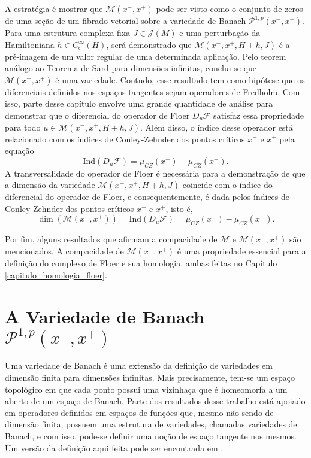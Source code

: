 \documentclass[12pt]{book}
\newcommand{\caminhosexponenciaisconectantes}[2]{\mathcal{P}^{1,p}(#1, #2)}
\newcommand{\caminhosexponenciaisconectantespadrao}{\caminhosexponenciaisconectantes{x^{-}}{x^{+}}}
\newcommand{\diferencialfloerponto}[1]{D_{#1}\operadorFloer}
\newcommand{\energiafinitaM}{\mathcal{M}}
\newcommand{\energiafinitaMconectante}{\energiafinitaM(x^{-}, x^{+})}
\newcommand{\energiafinitaMconectanteHamiltoniana}{\energiafinitaM(x^{-}, x^{+},H+h,J)}
\newcommand{\estruturascomplexasM}{\mathcal{J}(M)}
\newcommand{\iconley}[1]{\iconleyabrev(#1)}
\newcommand{\iconleyabrev}{\mu_{CZ}}
\newcommand{\ind}{\text{Ind}}
\newcommand{\operadorFloer}{\mathcal{F}}
\newcommand{\perturbacaoHamiltoniana}[1]{C^{\infty}_{\epsilon}(#1)}
\begin{document}
	A estratégia é mostrar que $\energiafinitaMconectante$ pode ser visto como o conjunto de zeros de uma seção de um fibrado vetorial sobre a variedade de Banach $\caminhosexponenciaisconectantespadrao$. Para uma estrutura complexa fixa $J \in \estruturascomplexasM$ e uma perturbação da Hamiltoniana $h\in \perturbacaoHamiltoniana{H}$, será demonstrado que $\energiafinitaMconectanteHamiltoniana$ é a pré-imagem de um valor regular de uma determinada aplicação. Pelo teorem análogo ao Teorema de Sard para dimensões infinitas, conclui-se que $\energiafinitaMconectante$ é uma variedade. Contudo, esse resultado tem como hipótese que os diferenciais definidos nos espaços tangentes sejam operadores de Fredholm. Com isso, parte desse capítulo envolve uma grande quantidade de análise para demonstrar que o diferencial do operador de Floer $\diferencialfloerponto{u}$ satisfaz essa propriedade para todo $u\in \energiafinitaMconectanteHamiltoniana$. Além disso, o índice desse operador está relacionado com os índices de Conley-Zehnder dos pontos críticos $x^{-}$ e $x^{+}$ pela equação
	$$
	\ind(\diferencialfloerponto{u})=\iconley{x^{-}}-\iconley{x^{+}}.
	$$
	A transversalidade do operador de Floer é necessária para a demonstração de que a dimensão da variedade $\energiafinitaMconectanteHamiltoniana$ coincide com o índice do diferencial do operador de Floer, e consequentemente, é dada pelos índices de Conley-Zehnder dos pontos críticos $x^{-}$ e $x^{+}$, isto é,
	$$
	\dim(\energiafinitaMconectante)= \ind(\diferencialfloerponto{u}) = \iconley{x^{-}}-\iconley{x^{+}}.
	$$
	
	Por fim, alguns resultados que afirmam a compacidade de $\energiafinitaM$ e $\energiafinitaMconectante$ são mencionados. A compacidade de $\energiafinitaMconectante$ é uma propriedade essencial para a definição do complexo de Floer e sua homologia, ambas feitas no Capítulo \ref{capitulo_homologia_floer}.
	
	\section{A Variedade de Banach $\caminhosexponenciaisconectantespadrao$}\label{secao_variedade_banach_P}
	
	Uma variedade de Banach é uma extensão da definição de variedades em dimensão finita para dimensões infinitas. Mais precisamente, tem-se um espaço topológico em que cada ponto possui uma vizinhaça que é homeomorfa a um aberto de um espaço de Banach. Parte dos resultados desse trabalho está apoiado em operadores definidos em espaços de funções que, mesmo não sendo de dimensão finita, possuem uma estrutura de variedades, chamadas variedades de Banach, e com isso, pode-se definir uma noção de espaço tangente nos mesmos. Um versão da definição aqui feita pode ser encontrada em \cite{chang_morse_infinito}.
	
\end{document}
